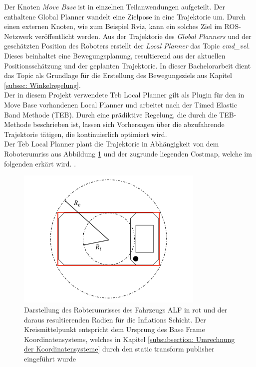 		    	Der Knoten \textit{Move Base }ist in einzelnen Teilanwendungen aufgeteilt. Der enthaltene Global Planner wandelt eine Zielpose in eine Trajektorie um. Durch einen externen Knoten, wie zum Beispiel Rviz, kann ein solches Ziel im ROS-Netzwerk veröffentlicht werden.
		    	 Aus der Trajektorie des \textit{Global Planners} und der geschätzten Position des Roboters erstellt der \textit{Local Planner} das Topic \textit{cmd\_vel}. Dieses beinhaltet eine Bewegungsplanung, resultierend aus der aktuellen Positionsschätzung und der geplanten Trajektorie. In dieser Bachelorarbeit dient das Topic als Grundlage für die Erstellung des Bewegungsziels aus Kapitel \ref{subsec: Winkelregelung}. \cite{movebase,cmdvel}\\
		    	
		    	Der in diesem Projekt verwendete Teb Local Planner gilt als Plugin für den in Move Base vorhandenen Local Planner und arbeitet nach der Timed Elastic Band Methode (TEB). Durch eine prädiktive Regelung, die durch die TEB-Methode beschrieben ist, lassen sich Vorhersagen über die abzufahrende Trajektorie tätigen, die kontinuierlich optimiert wird. \cite{tebmethode} \\
		    	
		    	Der Teb Local Planner plant die Trajektorie in Abhängigkeit von dem Roboterumriss aus Abbildung \ref{fig: footprint} und der zugrunde liegenden Costmap, welche im folgenden erkärt wird. \cite{tebmethode}.
		    	
		    	
		    \begin{figure}[H]
		    	\centering
		    	\includegraphics[width=0.8\textwidth]{Bilder/footprint.png}
		    	\caption{Darstellung des Robterumrisses des Fahrzeugs ALF in rot und der daraus resultierenden Radien für die Inflations Schicht. Der Kreismittelpunkt entspricht dem Ursprung des Base Frame Koordinatensystems, welches in Kapitel \ref{subsubsection: Umrechnung der Koordinatensysteme} durch den static transform publisher eingeführt wurde}
		    	\label{fig: footprint}
		  	  \end{figure}
		    
